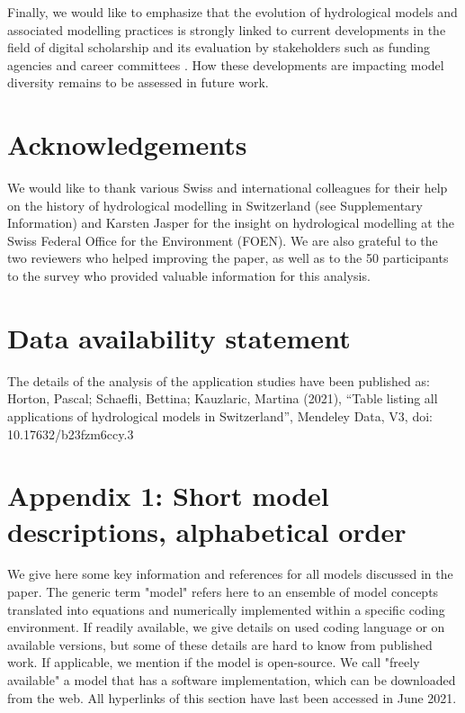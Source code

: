 \documentclass[10pt,a4paper]{article}
\begin{document}
Finally, we would like to emphasize that the evolution of hydrological models and associated modelling practices is strongly linked to current developments in the field of digital scholarship and its evaluation by stakeholders such as funding agencies and career committees \citep{David2016}. How these developments are impacting model diversity remains to be assessed in future work.

\section*{Acknowledgements}

We would like to thank various Swiss and international colleagues for their help on the history of hydrological modelling in Switzerland (see Supplementary Information) and Karsten Jasper for the insight on hydrological modelling at the Swiss Federal Office for the Environment (FOEN). We are also grateful to the two reviewers who helped improving the paper, as well as to the 50 participants to the survey who provided valuable information for this analysis.

\section*{Data availability statement}
The details of the analysis of the application studies have been published as: Horton, Pascal; Schaefli, Bettina; Kauzlaric, Martina (2021), “Table listing all applications of hydrological models in Switzerland”, Mendeley Data, V3, doi: 10.17632/b23fzm6ccy.3

\section*{Appendix 1: Short model descriptions, alphabetical order}
\label{appendix:1}

We give here some key information and references for all models discussed in the paper. The generic term "model" refers here to an ensemble of model concepts translated into equations and numerically implemented within a specific coding environment. If readily available, we give details on used coding language or on available versions, but some of these details are hard to know from published work. If applicable, we mention if the model is open-source. We call "freely available" a model that has a software implementation, which can be downloaded from the web. All hyperlinks of this section have last been accessed in June 2021.
\end{document}
